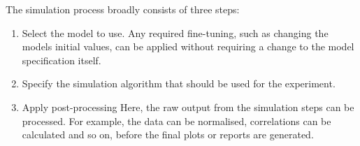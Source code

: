 \documentclass[\rootfolder/main.tex]{subfiles}
\begin{document}
The simulation process broadly consists of three steps:

\begin{enumerate}
    \item Select the model to use. Any required fine-tuning, such as changing the models initial values, can be applied without requiring a change to the model specification itself.
    \item Specify the simulation algorithm that should be used for the experiment.
    \item Apply post-processing
        Here, the raw output from the simulation steps can be processed. For example, the data can be normalised,
        correlations can be calculated and so on, before the final plots or reports are generated.
\end{enumerate}
\end{document}
